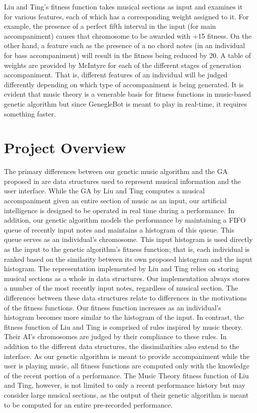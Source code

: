 \documentclass[conference]{IEEEtran}
\begin{document}
Liu and Ting’s fitness function takes musical sections as input and examines it for various features, each of which has a corresponding weight assigned to it. For example, the presence of a perfect fifth interval in the input (for main accompaniment) causes that chromosome to be awarded with +15 fitness. On the other hand, a feature such as the presence of a no chord notes (in an individual for bass accompaniment) will result in the fitness being reduced by 20. A table of weights are provided by McIntyre for each of the different stages of generation accompaniment. That is, different features of an individual will be judged differently depending on which type of accompaniment is being generated.  It is evident that music theory is a venerable basis for fitness functions in music-based genetic algorithm but since GenegleBot is meant to play in real-time, it requires something faster.

\section{Project Overview}

The primary differences between our genetic music algorithm and the GA proposed in \cite{b1} are data structures used to represent musical information and the user interface. While the GA by Liu and Ting computes a musical accompaniment given an entire section of music as an input, our artificial intelligence is designed to be operated in real time during a performance. In addition, our genetic algorithm models the performance by maintaining a FIFO queue of recently input notes and maintains a histogram of this queue. This queue serves as an individual's chromosome.  This input histogram is used directly as the input to the genetic algorithm's fitness function; that is, each individual is ranked based on the similarity between its own proposed histogram and the input histogram.
The representation implemented by Liu and Ting relies on storing musical sections as a whole in data structures\cite{b1}.  Our implementation always stores a number of the most recently input notes, regardless of musical section. The differences between these data structures relate to differences in the motivations of the fitness functions. Our fitness function increases as an individual's histogram becomes more similar to the histogram of the input. In contrast, the fitness function of Liu and Ting is comprised of rules inspired by music theory. Their AI's chromosomes are judged by their compliance to these rules\cite{b1}.
In addition to the different data structures, the dissimilarities also extend to the interface. As our genetic algorithm is meant to provide accompaniment while the user is playing music, all fitness functions are computed only with the knowledge of the recent portion of a performance. The Music Theory fitness function of Liu and Ting, however, is not limited to only a recent performance history but may consider large musical sections, as the output of their genetic algorithm is meant to be computed for an entire pre-recorded performance. 
\end{document}

